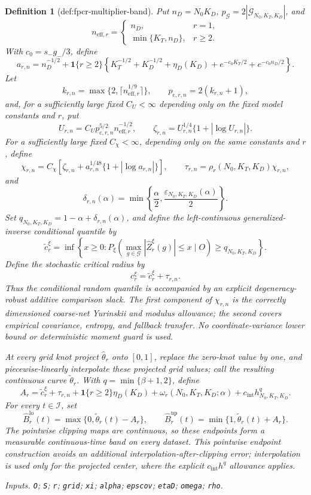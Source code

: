 \documentclass{article}
\newtheorem{definition}{Definition}
\begin{document}
\begin{definition}[def:fpcr-multiplier-band]
Put \(n_D=N_0K_D\), \(p_{\mathcal G}=2|\mathcal G_{N_0,K_T,K_D}|\), and
\[
 n_{\mathrm{eff},r}=
 \begin{cases}
 n_D,&r=1,\\
 \min\{K_T,n_D\},&r\ge2.
 \end{cases}
\]
With \(c_0=s_-g_-/3\), define
\[
 a_{r,n}=n_D^{-1/2}+\mathbf1\{r\ge2\}
 \left\{K_T^{-1/2}+K_D^{-1/2}+\eta_D(K_D)
 +e^{-c_0K_T/2}+e^{-c_0n_D/2}\right\}.
\]
Let
\[
 k_{r,n}=\max\{2,\lceil n_{\mathrm{eff},r}^{1/9}\rceil\},
 \qquad p_{\mathrm c,r,n}=2(k_{r,n}+1),
\]
and, for a sufficiently large fixed \(C_U<\infty\) depending only on the fixed model constants and \(r\), put
\[
 U_{r,n}=C_U p_{\mathrm c,r,n}^{5/2}n_{\mathrm{eff},r}^{-1/2},
 \qquad
 \zeta_{r,n}=U_{r,n}^{1/4}\{1+|\log U_{r,n}|\}.
\]
For a sufficiently large fixed \(C_\chi<\infty\), depending only on the same constants and \(r\), define
\[
 \chi_{r,n}=C_\chi\left[
 \zeta_{r,n}+a_{r,n}^{1/48}\{1+|\log a_{r,n}|\}\right],
 \qquad
 \tau_{r,n}=\rho_r(N_0,K_T,K_D)\chi_{r,n},
\]
and
\[
 \delta_{r,n}(\alpha)=
 \min\left\{\frac\alpha2,
 \frac{\varepsilon_{N_0,K_T,K_D}(\alpha)}2\right\}.
\]
Set \(q_{N_0,K_T,K_D}=1-\alpha+\delta_{r,n}(\alpha)\), and define the left-continuous generalized-inverse conditional quantile by
\[
 \widetilde c_r^\xi=
 \inf\left\{x\ge0:
 P_\xi\left(\max_{g\in\mathcal G}|\widehat Z_r^\xi(g)|\le x
 \mid O\right)\ge q_{N_0,K_T,K_D}\right\}.
\]
Define the stochastic critical radius by
\[
 c_r^\xi=\widetilde c_r^\xi+\tau_{r,n}.
\]
Thus the conditional random quantile is accompanied by an explicit degeneracy-robust additive comparison slack. The first component of \(\chi_{r,n}\) is the correctly dimensioned coarse-net Yurinskii and modulus allowance; the second covers empirical covariance, entropy, and fallback transfer. No coordinate-variance lower bound or deterministic moment guard is used.

At every grid knot project \(\widehat\theta_r\) onto \([0,1]\), replace the zero-knot value by one, and piecewise-linearly interpolate these projected grid values; call the resulting continuous curve \(\widetilde\theta_r\). With \(q=\min\{\beta+1,2\}\), define
\[
 A_r=\widetilde c_r^\xi+\tau_{r,n}
 +\mathbf1\{r\ge2\}\eta_D(K_D)
 +\omega_r(N_0,K_T,K_D;\alpha)
 +c_{\mathrm{int}}h_{N_0,K_T,K_D}^{q}.
\]
For every \(t\in\mathcal I\), set
\[
 \widehat B_r^{\mathrm{lo}}(t)=
 \max\{0,\widetilde\theta_r(t)-A_r\},\qquad
 \widehat B_r^{\mathrm{up}}(t)=
 \min\{1,\widetilde\theta_r(t)+A_r\}.
\]
The pointwise clipping maps are continuous, so these endpoints form a measurable continuous-time band on every dataset. This pointwise endpoint construction avoids an additional interpolation-after-clipping error; interpolation is used only for the projected center, where the explicit \(c_{\mathrm{int}}h^q\) allowance applies.
\par\smallskip\noindent\emph{Inputs.} \texttt{O}; \texttt{S}; \texttt{r}; \texttt{grid}; \texttt{xi}; \texttt{alpha}; \texttt{epscov}; \texttt{etaD}; \texttt{omega}; \texttt{rho}.
\end{definition}
\end{document}
